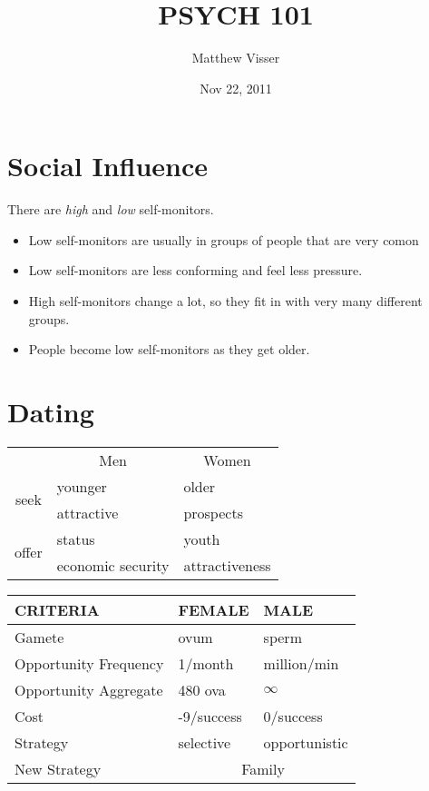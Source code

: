\documentclass[12pt]{article}
\begin{document}
\title{PSYCH 101}
\author{Matthew Visser}
\date{Nov 22, 2011}
\maketitle

\section{Social Influence}

There are \emph{high} and \emph{low} self-monitors.

\begin{itemize}
	\item Low self-monitors are usually in groups of people that are very comon
	\item Low self-monitors are less conforming and feel less pressure.
	\item High self-monitors change a lot, so they fit in with very many
		different groups.
	\item People become low self-monitors as they get older.
\end{itemize}

\section{Dating}

\begin{tabular}[b]{c|l|l|}
	\multicolumn{1}{c}{}   & \multicolumn{1}{c}{Men} & \multicolumn{1}{c}{Women} \\
	\cline{2-3}
	\multirow{2}{*}{seek}  & younger                 & older                     \\
	                       & attractive              & prospects                 \\
	\cline{2-3}
	\multirow{2}{*}{offer} & status                  & youth                     \\
	                       & economic security       & attractiveness            \\
	\cline{2-3}
\end{tabular}

\begin{tabular}[b]{|l|l|l|}
	\hline
	CRITERIA              & FEMALE                      &  MALE          \\
	\hline
	Gamete                & ovum                        &  sperm         \\
	\hline
	Opportunity Frequency & 1/month                     &  million/min   \\
	\hline
	Opportunity Aggregate & 480 ova                     &  $\infty$      \\
	\hline
	Cost                  & -9/success                  &  0/success     \\
	\hline
	Strategy              & selective                   &  opportunistic \\
	\hline
	New Strategy          & \multicolumn{2}{c|}{Family} \\
	\hline
\end{tabular}
\end{document}
